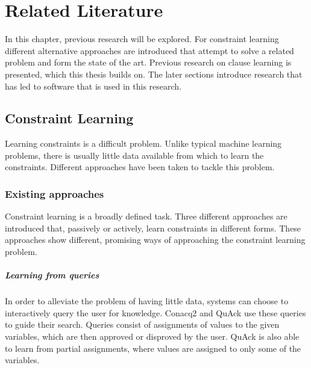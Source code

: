 \chapter{Related Literature}
\label{cha:rellit}

In this chapter, previous research will be explored.
For constraint learning different alternative approaches are introduced that attempt to solve a related problem and form the state of the art.
Previous research on clause learning is presented, which this thesis builds on.
The later sections introduce research that has led to software that is used in this research.

\section{Constraint Learning}
Learning constraints is a difficult problem.
Unlike typical machine learning problems, there is usually little data available from which to learn the constraints.
Different approaches have been taken to tackle this problem.

\subsection{Existing approaches}
Constraint learning is a broadly defined task.
Three different approaches are introduced that, passively or actively, learn constraints in different forms.
These approaches show different, promising ways of approaching the constraint learning problem.

\paragraph{Learning from queries}
In order to alleviate the problem of having little data, systems can choose to interactively query the user for knowledge.
Conacq2 \cite{bessiere2007query} and QuAck \cite{bessiere2013constraint} use these queries to guide their search.
Queries consist of assignments of values to the given variables, which are then approved or disproved by the user.
QuAck is also able to learn from partial assignments, where values are assigned to only some of the variables. 

